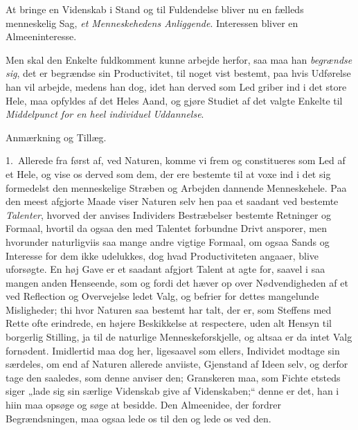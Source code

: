 \documentclass[12pt,a4paper]{book}
\newcommand{\apage}[1]{\marginnote{\footnotesize\textit{[#1]}}}
\begin{document}
At bringe en Videnskab i Stand og til Fuldendelse bliver nu en fælleds menneskelig
Sag, \emph{et Menneskehedens Anliggende}. Interessen bliver en Almeeninteresse.

\apage{196} Men skal
den Enkelte fuldkomment kunne arbejde herfor, saa maa han \emph{begrændse sig}, det er
begrændse sin Productivitet, til noget vist bestemt, paa hvis Udførelse han vil
arbejde, medens han dog, idet han derved som Led griber ind i det store Hele, maa
opfyldes af det Heles Aand, og gjøre Studiet af det valgte Enkelte til \emph{Middelpunct
for en heel individuel Uddannelse}.

\begin{center}Anmærkning og Tillæg.\end{center}

1.~Allerede fra først af, ved Naturen, komme vi frem og constitueres som Led af et
Hele, og vise os derved som dem, der ere bestemte til at voxe ind i det sig
formedelst den menneskelige Stræben og Arbejden dannende Menneskehele. Paa den
meest afgjorte Maade viser Naturen selv hen paa et saadant ved bestemte \emph{Talenter},
hvorved der anvises Individers Bestræbelser bestemte Retninger og Formaal, hvortil
da ogsaa den med Talentet forbundne Drivt ansporer, men hvorunder naturligviis saa
mange andre vigtige Formaal, om ogsaa Sands og Interesse for dem ikke udelukkes,
dog hvad Productiviteten angaaer, blive uforsøgte. En høj Gave er et saadant
afgjort Talent at agte for, saavel i saa mangen anden Henseende, som og fordi det
hæver op over Nødvendigheden af et ved Reflection og Overvejelse ledet Valg, og
befrier for dettes mangelunde Misligheder; thi hvor Naturen saa \apage{197} bestemt har talt,
der er, som Steffens med Rette ofte erindrede, en højere Beskikkelse at respectere,
uden alt Hensyn til borgerlig Stilling, ja til de naturlige Menneskeforskjelle, og
altsaa er da intet Valg fornødent. Imidlertid maa dog her, ligesaavel som ellers,
Individet modtage sin særdeles, om end af Naturen allerede anviiste, Gjenstand af
Ideen selv, og derfor tage den saaledes, som denne anviser den; Granskeren maa,
som Fichte etsteds siger „lade sig sin særlige Videnskab give af Videnskaben;“
denne er det, han i hiin maa opsøge og søge at besidde. Den Almeenidee, der fordrer
Begrændsningen, maa ogsaa lede os til den og lede os ved den.
\end{document}
